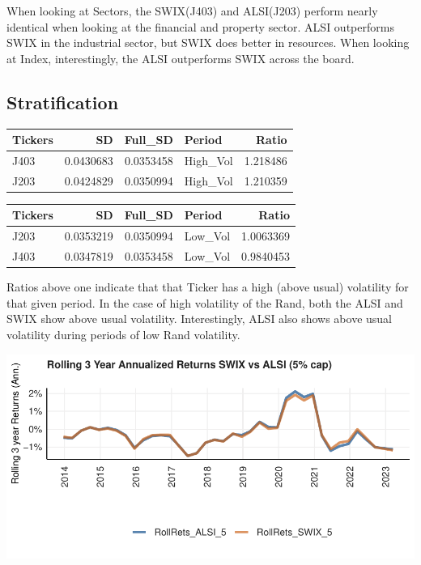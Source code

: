 \documentclass[11pt,preprint, authoryear]{elsarticle}
\let\origfigure\figure
\let\endorigfigure\endfigure
\renewenvironment{figure}[1][2] {
    \expandafter\origfigure\expandafter[H]
} {
    \endorigfigure
}
\numberwithin{equation}{section}
\numberwithin{figure}{section}
\numberwithin{table}{section}
\begin{document}
When looking at Sectors, the SWIX(J403) and ALSI(J203) perform nearly
identical when looking at the financial and property sector. ALSI
outperforms SWIX in the industrial sector, but SWIX does better in
resources. When looking at Index, interestingly, the ALSI outperforms
SWIX across the board.

\hypertarget{stratification}{%
\subsection{Stratification}\label{stratification}}

\begin{tabular}{l|r|r|l|r}
\hline
Tickers & SD & Full\_SD & Period & Ratio\\
\hline
J403 & 0.0430683 & 0.0353458 & High\_Vol & 1.218486\\
\hline
J203 & 0.0424829 & 0.0350994 & High\_Vol & 1.210359\\
\hline
\end{tabular}

\begin{tabular}{l|r|r|l|r}
\hline
Tickers & SD & Full\_SD & Period & Ratio\\
\hline
J203 & 0.0353219 & 0.0350994 & Low\_Vol & 1.0063369\\
\hline
J403 & 0.0347819 & 0.0353458 & Low\_Vol & 0.9840453\\
\hline
\end{tabular}

Ratios above one indicate that that Ticker has a high (above usual)
volatility for that given period. In the case of high volatility of the
Rand, both the ALSI and SWIX show above usual volatility. Interestingly,
ALSI also shows above usual volatility during periods of low Rand
volatility.

\begin{figure}[H]

{\centering \includegraphics{Question3_files/figure-latex/Figure2-1} 

}

\caption{Rolling 3 Year Annualized Returns SWIX vs ALSI (5\% cap)}\label{fig:Figure2}
\end{figure}
\end{document}
